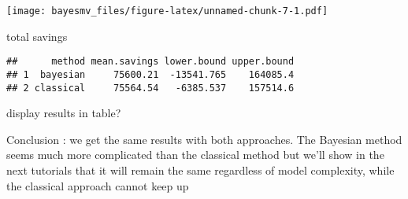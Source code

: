 \documentclass[
]{article}
\newenvironment{Shaded}{\begin{snugshade}}{\end{snugshade}}
\newcommand{\CommentTok}[1]{\textcolor[rgb]{0.56,0.35,0.01}{\textit{#1}}}
\newcommand{\DecValTok}[1]{\textcolor[rgb]{0.00,0.00,0.81}{#1}}
\newcommand{\FloatTok}[1]{\textcolor[rgb]{0.00,0.00,0.81}{#1}}
\newcommand{\FunctionTok}[1]{\textcolor[rgb]{0.00,0.00,0.00}{#1}}
\newcommand{\NormalTok}[1]{#1}
\newcommand{\OtherTok}[1]{\textcolor[rgb]{0.56,0.35,0.01}{#1}}
\newcommand{\SpecialCharTok}[1]{\textcolor[rgb]{0.00,0.00,0.00}{#1}}
\newcommand{\StringTok}[1]{\textcolor[rgb]{0.31,0.60,0.02}{#1}}
\begin{document}
\texttt{[image: bayesmv\_files/figure-latex/unnamed-chunk-7-1.pdf]}

total savings

\begin{Shaded}
\end{Shaded}

\begin{verbatim}
##      method mean.savings lower.bound upper.bound
## 1  bayesian     75600.21  -13541.765    164085.4
## 2 classical     75564.54   -6385.537    157514.6
\end{verbatim}

display results in table?

Conclusion : we get the same results with both approaches. The Bayesian method seems much more complicated than the classical method but we'll show in the next tutorials that it will remain the same regardless of model complexity, while the classical approach cannot keep up
\end{document}
